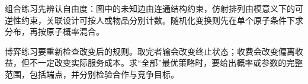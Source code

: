 组合练习先辨认自由度：图中的未知边由连通结构约束，仿射排列由模意义下的可逆性约束，关联设计可按人或物品分别计数。随机化变换则先在单个原子条件下求分布，再按原子概率混合。

博弈练习要重新检查改变后的规则。取完者输会改变终止状态；收费会改变偏离收益，但不一定改变实际服务成本。求“全部”最优策略时，要给出概率或参数的完整范围，包括端点，并分别检验合作与竞争目标。
\par\smallskip
